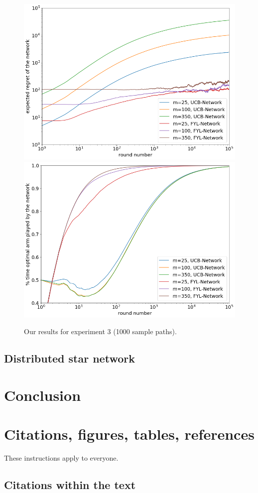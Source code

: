 \documentclass{article}
\begin{document}
\begin{figure}[H]
  \centering
  \includegraphics[width=0.49\linewidth]{fig3_1_ours.png}
  \includegraphics[width=0.49\linewidth]{fig3_2_ours.png}
  \caption{Our results for experiment 3 (1000 sample paths).}
\end{figure}

\subsection{Distributed star network}



\section{Conclusion}

{\small


}

\newpage

\section{Citations, figures, tables, references}
\label{others}

These instructions apply to everyone.

\subsection{Citations within the text}
\end{document}

